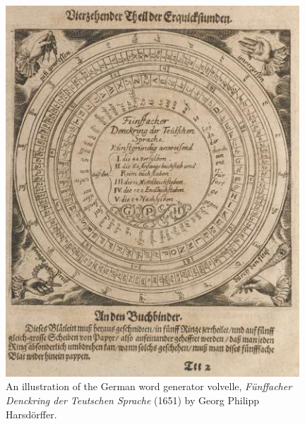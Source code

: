 \begin{figure}[p]
    \centering
    \includegraphics[width=0.98\textwidth]{ch2/images/baroque_volvelle.png}
  
\caption{An illustration of the German word generator volvelle, \textit{F{\"u}nffacher
Denckring der Teutschen Sprache} (1651) by Georg Philipp Harsd{\"o}rffer.}
\label{fig:baroque_volvelle}

\end{figure}
